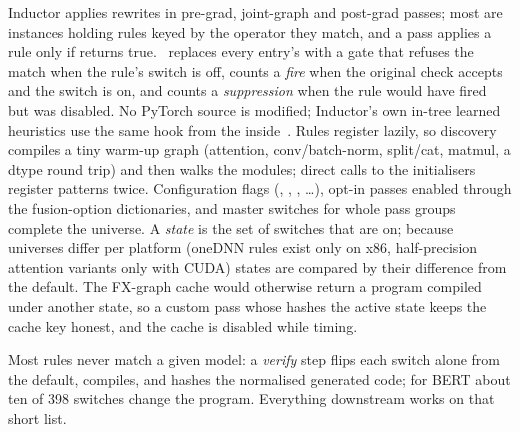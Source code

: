 \label{sec:switches}
Inductor applies rewrites in pre-grad, joint-graph and post-grad passes; most are  instances
holding  rules keyed by the operator they match, and a pass applies a rule only if
 returns true. \tool\ replaces every entry's  with a gate that refuses
the match when the rule's switch is off, counts a \emph{fire} when the original check accepts and the switch is on, and
counts a \emph{suppression} when the rule would have fired but was disabled. No PyTorch source is modified; Inductor's
own in-tree learned heuristics use the same hook from the inside~\cite{autoheuristic}. Rules register lazily, so
discovery compiles a tiny warm-up graph (attention, conv/batch-norm, split/cat, matmul, a dtype round trip) and then
walks the  modules; direct calls to the initialisers register patterns twice. Configuration flags
(, , , \ldots), opt-in passes enabled through the
fusion-option dictionaries, and master switches for whole pass groups complete the universe. A \emph{state} is the set
of switches that are on; because universes differ per platform (oneDNN rules exist only on x86, half-precision
attention variants only with CUDA) states are compared by their difference from the default. The FX-graph cache would
otherwise return a program compiled under another state, so a custom pass whose  hashes the active state
keeps the cache key honest, and the cache is disabled while timing.

Most rules never match a given model: a \emph{verify} step flips each switch alone from the default, compiles, and
hashes the normalised generated code; for BERT about ten of 398 switches change the program. Everything downstream
works on that short list.
